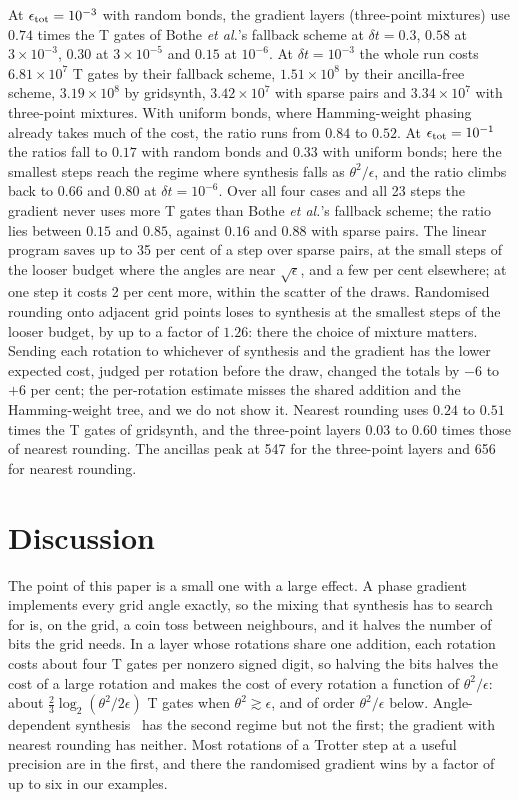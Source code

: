 \documentclass[aps,prx,twocolumn,superscriptaddress,nofootinbib,longbibliography]{revtex4-2}
\theoremstyle{remark}
\begin{document}
At $\epsilon_{\rm tot}=10^{-3}$ with random bonds, the gradient layers (three-point mixtures)
use $0.74$ times the T gates of Bothe \textit{et al.}'s fallback scheme at $\delta t=0.3$, $0.58$
at $3\times10^{-3}$, $0.30$ at $3\times10^{-5}$ and $0.15$ at $10^{-6}$. At $\delta t=10^{-3}$
the whole run costs $6.81\times10^7$ T gates by their fallback scheme, $1.51\times10^8$ by their
ancilla-free scheme, $3.19\times10^8$ by gridsynth, $3.42\times10^7$ with sparse pairs and
$3.34\times10^7$ with three-point mixtures. With uniform bonds, where Hamming-weight phasing
already takes much of the cost, the ratio runs from $0.84$ to $0.52$. At
$\epsilon_{\rm tot}=10^{-1}$ the ratios fall to $0.17$ with random bonds and $0.33$ with uniform
bonds; here the smallest steps reach the regime where synthesis falls as $\theta^2/\epsilon$,
and the ratio climbs back to $0.66$ and $0.80$ at $\delta t=10^{-6}$. Over all four cases and
all 23 steps the gradient never uses more T gates than Bothe \textit{et al.}'s fallback scheme;
the ratio lies between $0.15$ and $0.85$, against $0.16$ and $0.88$ with sparse pairs. The
linear program saves up to 35 per cent of a step over sparse pairs, at the small steps of the
looser budget where the angles are near $\sqrt\epsilon$, and a few per cent elsewhere; at one
step it costs 2 per cent more, within the scatter of the draws. Randomised rounding onto
adjacent grid points loses to synthesis at the smallest steps of the looser budget, by up to a
factor of $1.26$: there the choice of mixture matters. Sending each rotation to whichever of
synthesis and the gradient has the lower expected cost, judged per rotation before the draw,
changed the totals by $-6$ to $+6$ per cent; the per-rotation estimate misses the shared
addition and the Hamming-weight tree, and we do not show it. Nearest rounding uses $0.24$ to
$0.51$ times the T gates of gridsynth, and the three-point layers $0.03$ to $0.60$ times those
of nearest rounding. The ancillas peak at 547 for the three-point layers and 656 for nearest
rounding.

\section{Discussion}\label{sec:discussion}

The point of this paper is a small one with a large effect. A phase gradient implements every
grid angle exactly, so the mixing that synthesis has to search for is, on the grid, a coin toss
between neighbours, and it halves the number of bits the grid needs. In a layer whose
rotations share one addition, each rotation costs about four T gates per nonzero signed digit,
so halving the bits halves the cost of a large rotation and makes the cost of every rotation a
function of $\theta^2/\epsilon$: about $\tfrac23\log_2(\theta^2/2\epsilon)$ T gates when
$\theta^2\gtrsim\epsilon$, and of order $\theta^2/\epsilon$ below. Angle-dependent
synthesis~\cite{Bothe2026} has the second regime but not the first; the gradient with nearest
rounding has neither. Most rotations of a Trotter step at a useful precision are in the first,
and there the randomised gradient wins by a factor of up to six in our examples.
\end{document}
